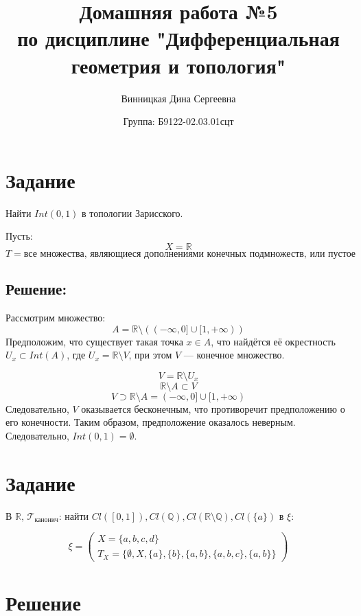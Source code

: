 \documentclass{article}
\title{\vspace{-1cm}Домашняя работа №5 \\ по дисциплине "Дифференциальная геометрия и топология"}
\author{Винницкая Дина Сергеевна}
\date{Группа: Б9122-02.03.01сцт}
\begin{document}
	
	\maketitle


        \section{Задание}

        Найти \( Int(0, 1) \) в топологии Зарисского. 
        
        Пусть:
        \[
        X = \mathbb{R}
        \]
        \[
        T = \text{все множества, являющиеся дополнениями конечных подмножеств, или пустое множество}
        \]
        \subsection{Решение:}
    
        Рассмотрим множество:
        \[
        A = \mathbb{R} \setminus ((-\infty, 0] \cup [1, +\infty))
        \]
        Предположим, что существует такая точка \( x \in A \), что найдётся её окрестность \( U_x \subset Int(A) \), где \( U_x = \mathbb{R} \setminus V \), при этом \(V\) — конечное множество.
        
        \[
        V = \mathbb{R} \setminus U_x
        \]
        \[
        \mathbb{R} \setminus A \subset V
        \]
        \[
        V\supset \mathbb{R} \setminus A = (-\infty, 0] \cup [1, +\infty)
        \]
        Следовательно, \(V\) оказывается бесконечным, что противоречит предположению о его конечности.
        Таким образом, предположение оказалось неверным.
        Следовательно, \( Int(0, 1) = \emptyset \).


        
        \section{Задание}
        В \( \mathbb{R}, \, \mathcal{T}_{\text{канонич}} \): найти \( Cl([0, 1]), Cl(\mathbb{Q}), Cl(\mathbb{R} \setminus \mathbb{Q}), Cl(\{a\}) \) в \( \xi \):

\[
\xi = \begin{pmatrix}
X = \{a, b, c, d\} \\
T_X = \{\emptyset, X, \{a\}, \{b\}, \{a, b\}, \{a, b, c\}, \{a, b\}\}
\end{pmatrix}
\]

\section*{Решение}
\end{document}
